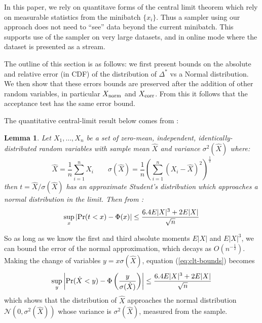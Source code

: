 \documentclass{article}
\newtheorem{lemma}{Lemma}
\begin{document}
In this paper, we rely on quantitave forms of the central limit theorem which rely on measurable
statistics from the minibatch $\{x_i\}$. Thus a sampler using our approach does not need to ``see''
data beyond the current minibatch. This supports use of the sampler on very large datasets, and
in online mode where the dataset is presented as a stream.

The outline of this section is as follows: we first present bounds on the absolute
and relative error (in CDF) of the distribution of $\Delta^*$ vs a Normal distribution. We then show that
these errors bounds are preserved after the addition of other random variables, in particular
$X_{\rm norm}$ and $X_{\rm corr}$. From this it follows that the acceptance test has the same error bound.

The quantitative central-limit result below comes from \cite{explicit-clt05}:
  

\begin{lemma}\label{lem:quant_clt}
  Let $X_1,\ldots,X_n$ be
a set of zero-mean, independent, identically-distributed random variables with sample mean $\hat{X}$ and
variance $\sigma^2(\hat{X})$ where:
\begin{equation}
  \hat{X} = \frac{1}{n}\sum_{i=1}^nX_i \qquad   \sigma(\hat{X}) = \frac{1}{n}\left(\sum_{i=1}^n(X_i-\hat{X})^2\right)^{\frac{1}{2}}
\end{equation}
then $t=\hat{X}/\sigma(\hat{X})$ has an approximate Student's distribution which approaches a normal
distribution in the limit. Then from \cite{explicit-clt05}:
\begin{equation}\label{eq:clt-bounds}
 \sup_x|{\rm Pr}(t<x) - \Phi(x)| \leq \frac{6.4E|X|^3+2E|X|}{\sqrt{n}}
  \end{equation}
\end{lemma}

So as long as we know the first and third absolute moments $E|X|$ and $E|X|^3$, we can bound the
error of the normal approximation, which decays as $O(n^{-\frac{1}{2}})$. Making the change of variables
$y = x \sigma(\hat{X})$, equation (\ref{eq:clt-bounds}) becomes
\begin{equation}\label{eq:clt-bounds2}
   \sup_y\left|{\rm Pr}(\hat{X}< y) - \Phi\left(\frac{y}{\sigma(\hat{X})}\right)\right| \leq \frac{6.4E|X|^3+2E|X|}{\sqrt{n}}
\end{equation}
which shows that the distribution of $\hat{X}$ approaches the normal distribution $\mathcal{N}(0,\sigma^2(\hat{X}))$
whose variance is $\sigma^2(\hat{X})$, measured from the sample.
\end{document}
